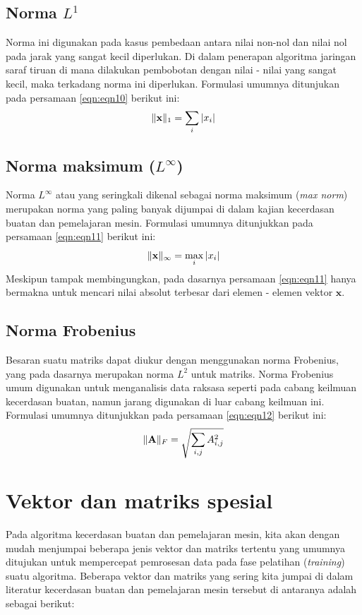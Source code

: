 \subsection{Norma $L^1$}
Norma ini digunakan pada kasus pembedaan antara nilai non-nol dan nilai nol pada jarak yang sangat kecil diperlukan. Di dalam penerapan algoritma jaringan saraf tiruan di mana dilakukan pembobotan dengan nilai - nilai yang sangat kecil, maka terkadang norma ini diperlukan. Formulasi umumnya ditunjukan pada persamaan \ref{eqn:eqn10} berikut ini:
\begin{equation}\label{eqn:eqn10}
     \lVert\mathbf{x}\rVert_{1} = \sum_{i}|x_{i}|
\end{equation}
\subsection{Norma maksimum ($L^{\infty}$)}
Norma $L^\infty$ atau yang seringkali dikenal sebagai norma maksimum (\textit{max norm}) merupakan norma yang paling banyak dijumpai di dalam kajian kecerdasan buatan dan pemelajaran mesin. Formulasi umumnya ditunjukkan pada persamaan \ref{eqn:eqn11} berikut ini:
\begin{equation}\label{eqn:eqn11}
    \lVert\mathbf{x}\rVert_{\infty} = \max_{i} |x_{i}|
\end{equation}
Meskipun tampak membingungkan, pada dasarnya persamaan \ref{eqn:eqn11} hanya bermakna untuk mencari nilai absolut terbesar dari elemen - elemen vektor $\mathbf{x}$.

\subsection{Norma Frobenius}
Besaran suatu matriks dapat diukur dengan menggunakan norma Frobenius, yang pada dasarnya merupakan norma $L^2$ untuk matriks. Norma Frobenius umum digunakan untuk menganalisis data raksasa seperti pada cabang keilmuan kecerdasan buatan, namun jarang digunakan di luar cabang keilmuan ini. Formulasi umumnya ditunjukkan pada persamaan \ref{eqn:eqn12} berikut ini:
\begin{equation}\label{eqn:eqn12}
    \lVert\mathbf{A}\rVert_{F} = \sqrt{\sum_{i,j}A_{i,j}^{2}}
\end{equation}

\section{Vektor dan matriks spesial}
Pada algoritma kecerdasan buatan dan pemelajaran mesin, kita akan dengan mudah menjumpai beberapa jenis vektor dan matriks tertentu yang umumnya ditujukan untuk mempercepat pemrosesan data pada fase pelatihan (\textit{training}) suatu algoritma. Beberapa vektor dan matriks yang sering kita jumpai di dalam literatur kecerdasan buatan dan pemelajaran mesin tersebut di antaranya adalah sebagai berikut:

